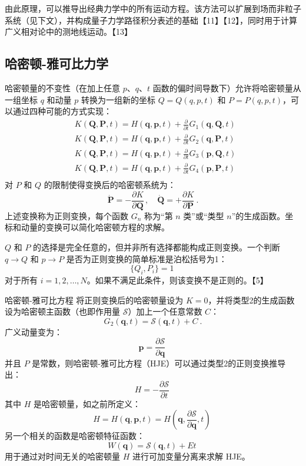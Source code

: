 由此原理，可以推导出经典力学中的所有运动方程。该方法可以扩展到场而非粒子系统（见下文），并构成量子力学路径积分表述的基础【11】【12】，同时用于计算广义相对论中的测地线运动。【13】
\subsection{哈密顿-雅可比力学}  
哈密顿量的不变性（在加上任意 \( p \)、\( q \)、\( t \) 函数的偏时间导数下）允许将哈密顿量从一组坐标 \( q \) 和动量 \( p \) 转换为一组新的坐标 \( Q = Q(q, p, t) \) 和 \( P = P(q, p, t) \)，可以通过四种可能的方式实现：
\[
\begin{aligned}
&K(\mathbf{Q}, \mathbf{P}, t) = H(\mathbf{q}, \mathbf{p}, t) + \frac{\partial}{\partial t} G_1(\mathbf{q}, \mathbf{Q}, t) \\
&K(\mathbf{Q}, \mathbf{P}, t) = H(\mathbf{q}, \mathbf{p}, t) + \frac{\partial}{\partial t} G_2(\mathbf{q}, \mathbf{P}, t) \\
&K(\mathbf{Q}, \mathbf{P}, t) = H(\mathbf{q}, \mathbf{p}, t) + \frac{\partial}{\partial t} G_3(\mathbf{p}, \mathbf{Q}, t) \\
&K(\mathbf{Q}, \mathbf{P}, t) = H(\mathbf{q}, \mathbf{p}, t) + \frac{\partial}{\partial t} G_4(\mathbf{p}, \mathbf{P}, t) \\
\end{aligned}~
\]
对 \( P \) 和 \( Q \) 的限制使得变换后的哈密顿系统为：
\[
\mathbf{\dot{P}} = -\frac{\partial K}{\partial \mathbf{Q}} \,, \quad \mathbf{\dot{Q}} = +\frac{\partial K}{\partial \mathbf{P}} ~.
\]
上述变换称为正则变换，每个函数 \( G_n \) 称为“第 \( n \) 类”或“类型 \( n \)”的生成函数。坐标和动量的变换可以简化哈密顿方程的求解。

\( Q \) 和 \( P \) 的选择是完全任意的，但并非所有选择都能构成正则变换。一个判断 \( q \to Q \) 和 \( p \to P \) 是否为正则变换的简单标准是泊松括号为1：
\[
\{ Q_i, P_i \} = 1~
\]
对于所有 \( i = 1, 2, \dots, N \)。如果不满足此条件，则该变换不是正则的。【5】

哈密顿-雅可比方程  
将正则变换后的哈密顿量设为 \( K = 0 \)，并将类型2的生成函数设为哈密顿主函数（也即作用量 \( \mathcal{S} \)）加上一个任意常数 \( C \)：
\[
G_2(\mathbf{q}, t) = \mathcal{S}(\mathbf{q}, t) + C ~.
\]
广义动量变为：
\[
\mathbf{p} = \frac{\partial \mathcal{S}}{\partial \mathbf{q}}~
\]
并且 \( P \) 是常数，则哈密顿-雅可比方程（HJE）可以通过类型2的正则变换推导出：
\[
H = -\frac{\partial \mathcal{S}}{\partial t}~
\]
其中 \( H \) 是哈密顿量，如之前所定义：
\[
H = H(\mathbf{q}, \mathbf{p}, t) = H\left(\mathbf{q}, \frac{\partial \mathcal{S}}{\partial \mathbf{q}}, t\right)~
\]
另一个相关的函数是哈密顿特征函数：
\[
W(\mathbf{q}) = \mathcal{S}(\mathbf{q}, t) + Et~
\]
用于通过对时间无关的哈密顿量 \( H \) 进行可加变量分离来求解 HJE。

